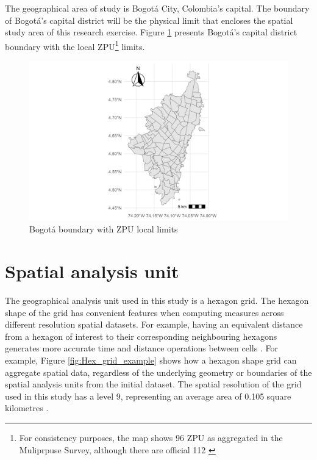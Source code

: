 \documentclass[12pt, a4paper]{report}
\begin{document}
The geographical area of study is Bogotá City, Colombia's capital. The boundary of Bogotá's capital district will be the physical limit that encloses the spatial study area of this research exercise. Figure \ref{fig:Study_Area_ZPU} presents Bogotá's capital district boundary with the local ZPU\footnote{For consistency purposes, the map shows 96 ZPU as aggregated in the Muliprpuse Survey, although there are official 112 \citep{secretariadistritaldegobiernoCaracterizacionUsuarios20212021}} limits.

\begin{figure}[H]
    \centering
    \includegraphics[width=16cm]{Data/Results/Images/Study_Area_UPZ.png}
    \caption{Bogotá boundary with ZPU local limits \citep{ secretariadistritaldeplaneacionCapaGeograficaEncuesta2023}}
    \label{fig:Study_Area_ZPU}
\end{figure}


\section{Spatial analysis unit}

The geographical analysis unit used in this study is a hexagon grid. The hexagon shape of the grid has convenient features when computing measures across different resolution spatial datasets. For example, having an equivalent distance from a hexagon of interest to their corresponding neighbouring hexagons generates more accurate time and distance operations between cells \citep{ubertechnologiesH3HexagonalHierarchical2023}. For example, Figure \ref{fig:Hex_grid_example} shows how a hexagon shape grid can aggregate spatial data, regardless of the underlying geometry or boundaries of the spatial analysis units from the initial dataset. The spatial resolution of the grid used in this study has a level 9, representing an average area of 0.105 square kilometres \citep{ubertechnologiesH3HexagonalHierarchical2023}.
\end{document}

